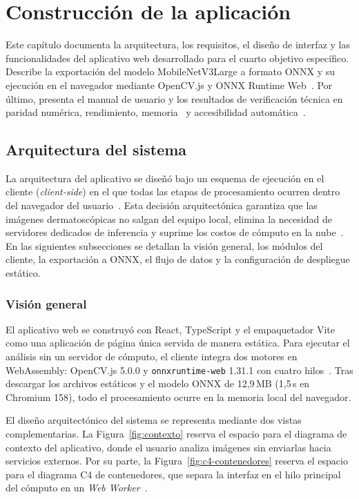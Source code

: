 \chapter{Construcción de la aplicación}

Este capítulo documenta la arquitectura, los requisitos, el diseño de interfaz y las funcionalidades del aplicativo web desarrollado para el cuarto objetivo específico. Describe la exportación del modelo MobileNetV3Large a formato ONNX y su ejecución en el navegador mediante OpenCV.js y ONNX Runtime Web~\cite{ning2024onnxweb}. Por último, presenta el manual de usuario y los resultados de verificación técnica en paridad numérica, rendimiento, memoria~\cite{wang2025browser} y accesibilidad automática~\cite{w3c2023wcag22}.

\section{Arquitectura del sistema}

La arquitectura del aplicativo se diseñó bajo un esquema de ejecución en el cliente (\textit{client-side}) en el que todas las etapas de procesamiento ocurren dentro del navegador del usuario~\cite{ning2024onnxweb}. Esta decisión arquitectónica garantiza que las imágenes dermatoscópicas no salgan del equipo local, elimina la necesidad de servidores dedicados de inferencia y suprime los costos de cómputo en la nube~\cite{ning2024onnxweb}. En las siguientes subsecciones se detallan la visión general, los módulos del cliente, la exportación a ONNX, el flujo de datos y la configuración de despliegue estático.

\subsection{Visión general}

El aplicativo web se construyó con React, TypeScript y el empaquetador Vite como una aplicación de página única servida de manera estática. Para ejecutar el análisis sin un servidor de cómputo, el cliente integra dos motores en WebAssembly: OpenCV.js 5.0.0 y \texttt{onnxruntime-web} 1.31.1 con cuatro hilos~\cite{ning2024onnxweb}. Tras descargar los archivos estáticos y el modelo ONNX de 12,9\,MB (1,5\,s en Chromium 158), todo el procesamiento ocurre en la memoria local del navegador.

El diseño arquitectónico del sistema se representa mediante dos vistas complementarias. La Figura~\ref{fig:contexto} reserva el espacio para el diagrama de contexto del aplicativo, donde el usuario analiza imágenes sin enviarlas hacia servicios externos. Por su parte, la Figura~\ref{fig:c4-contenedores} reserva el espacio para el diagrama C4 de contenedores, que separa la interfaz en el hilo principal del cómputo en un \textit{Web Worker}~\cite{wang2025browser,ning2024onnxweb}.

